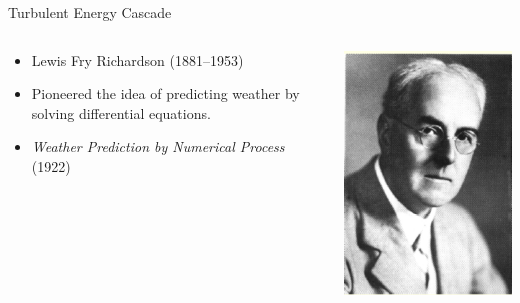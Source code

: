 \begin{frame}{Turbulent Energy Cascade}
  
\setlength{\fboxsep}{0pt}
\setlength{\fboxrule}{1pt}
\begin{columns}[T]
    \begin{column}{.58\textwidth}
    	\begin{itemize}
    		\item Lewis Fry Richardson (1881--1953)
    		\item Pioneered the idea of predicting weather by solving differential equations.
    		\item \emph{Weather Prediction by Numerical Process} (1922)
    	\end{itemize}	
    \end{column}
    \begin{column}{.42\textwidth}
    	\begin{minipage}[c][.5\textheight][c]{\linewidth}
    		\includegraphics[width=\textwidth]{richardson.png}
    	\end{minipage}
    \end{column}
  \end{columns}
\end{frame}

